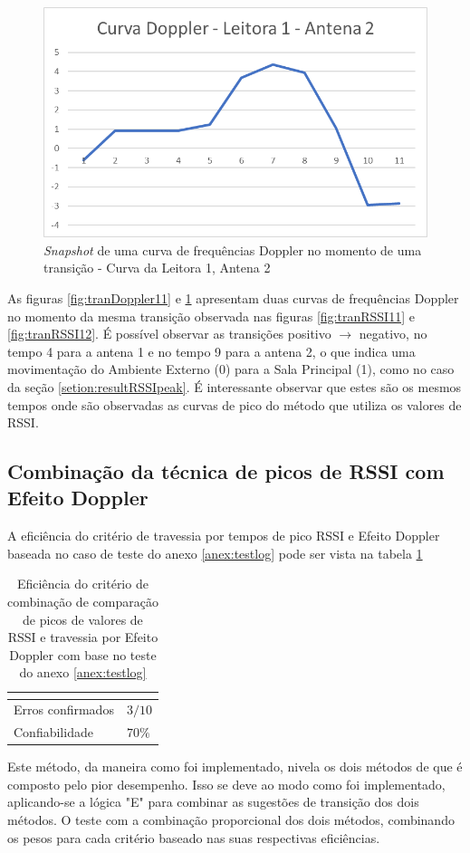 \begin{figure}[H]
    \centering
    \includegraphics[width=0.8\linewidth]{figs/Resultados/image004.png}
    \caption{\textit{Snapshot} de uma curva de frequências Doppler no momento de uma transição - Curva da Leitora 1, Antena 2}
    \label{fig:tranDoppler12}
\end{figure}

As figuras \ref{fig:tranDoppler11} e \ref{fig:tranDoppler12} apresentam duas curvas de frequências Doppler no momento da mesma transição observada nas figuras \ref{fig:tranRSSI11} e  \ref{fig:tranRSSI12}. É possível observar as transições positivo $\rightarrow$ negativo, no tempo 4 para a antena 1 e no tempo 9 para a antena 2, o que indica uma movimentação do Ambiente Externo (0) para a Sala Principal (1), como no caso da seção \ref{setion:resultRSSIpeak}. É interessante observar que estes são os mesmos tempos onde são observadas as curvas de pico do método que utiliza os valores de RSSI.


\subsection{Combinação da técnica de picos de RSSI com Efeito Doppler}

A eficiência do critério de travessia por tempos de pico RSSI e  Efeito Doppler baseada no caso de teste do anexo \ref{anex:testlog} pode ser vista na tabela \ref{tab:resultados6}

\begin{table}[H]
\centering
\caption{Eficiência do critério de combinação de comparação de picos de valores de RSSI e travessia por Efeito Doppler com base no teste do anexo \ref{anex:testlog} }
\label{tab:resultados6}
\begin{tabular}{p{5cm} p{5cm}}
\hline
\multicolumn{2}{c}{\cellcolor{lightgray}{Eficiência do critério: Travessia por efeito Doppler}} \\ \hline
Erros confirmados          &  $3 / 10$        \\
Confiabilidade & $70\%$ \\ \hline
\end{tabular}
\end{table}

Este método, da maneira como foi implementado, nivela os dois métodos de que é composto pelo pior desempenho. Isso se deve ao modo como foi implementado, aplicando-se a lógica "E" para combinar as sugestões de transição dos dois métodos. O teste com a combinação proporcional dos dois métodos, combinando os pesos para cada critério baseado nas suas respectivas eficiências.